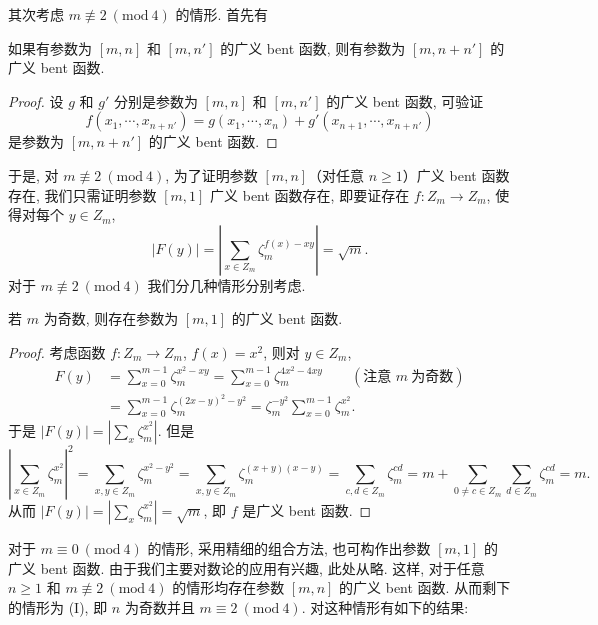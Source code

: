 其次考虑 $m\not\equiv 2\ (\mathrm{mod}\ 4)$ 的情形. 首先有

\begin{lemma}\label{lem:ch9-9}
如果有参数为 $[m,n]$ 和 $[m,n']$ 的广义 bent 函数, 则有参数为 $[m,n+n']$ 的广义 bent 函数.
\end{lemma}

\begin{proof}
设 $g$ 和 $g'$ 分别是参数为 $[m,n]$ 和 $[m,n']$ 的广义 bent 函数, 可验证
\[
  f(x_1,\cdots,x_{n+n'})=g(x_1,\cdots,x_n)+g'(x_{n+1},\cdots,x_{n+n'})
\]
是参数为 $[m,n+n']$ 的广义 bent 函数.
\end{proof}

于是, 对 $m\not\equiv 2\ (\mathrm{mod}\ 4)$, 为了证明参数 $[m,n]$（对任意 $n\geqslant 1$）广义 bent 函数存在, 我们只需证明参数 $[m,1]$ 广义 bent 函数存在, 即要证存在 $f\colon Z_m\to Z_m$, 使得对每个 $y\in Z_m$,
\[
  |F(y)|=\left|\sum_{x\in Z_m}\zeta_m^{f(x)-xy}\right|=\sqrt{m}.
\]
对于 $m\not\equiv 2\ (\mathrm{mod}\ 4)$ 我们分几种情形分别考虑.

\begin{theorem}\label{thm:9.24}
若 $m$ 为奇数, 则存在参数为 $[m,1]$ 的广义 bent 函数.
\end{theorem}

\begin{proof}
考虑函数 $f\colon Z_m\to Z_m$, $f(x)=x^2$, 则对 $y\in Z_m$,
\[
  \begin{aligned}
    F(y)&=\sum_{x=0}^{m-1}\zeta_m^{x^2-xy}
    =\sum_{x=0}^{m-1}\zeta_m^{4x^2-4xy}\qquad(\text{注意 } m\ \text{为奇数})\\
    &=\sum_{x=0}^{m-1}\zeta_m^{(2x-y)^2-y^2}
    =\zeta_m^{-y^2}\sum_{x=0}^{m-1}\zeta_m^{x^2}.
  \end{aligned}
\]
于是 $|F(y)|=\left|\sum_x\zeta_m^{x^2}\right|$. 但是
\[
  \left|\sum_{x\in Z_m}\zeta_m^{x^2}\right|^2
  =\sum_{x,y\in Z_m}\zeta_m^{x^2-y^2}
  =\sum_{x,y\in Z_m}\zeta_m^{(x+y)(x-y)}
  =\sum_{c,d\in Z_m}\zeta_m^{cd}
  =m+\sum_{0\neq c\in Z_m}\sum_{d\in Z_m}\zeta_m^{cd}=m.
\]
从而 $|F(y)|=\left|\sum_x\zeta_m^{x^2}\right|=\sqrt{m}$, 即 $f$ 是广义 bent 函数.
\end{proof}

对于 $m\equiv 0\ (\mathrm{mod}\ 4)$ 的情形, 采用精细的组合方法, 也可构作出参数 $[m,1]$ 的广义 bent 函数. 由于我们主要对数论的应用有兴趣, 此处从略. 这样, 对于任意 $n\geqslant 1$ 和 $m\not\equiv 2\ (\mathrm{mod}\ 4)$ 的情形均存在参数 $[m,n]$ 的广义 bent 函数. 从而剩下的情形为 (I), 即 $n$ 为奇数并且 $m\equiv 2\ (\mathrm{mod}\ 4)$. 对这种情形有如下的结果:

